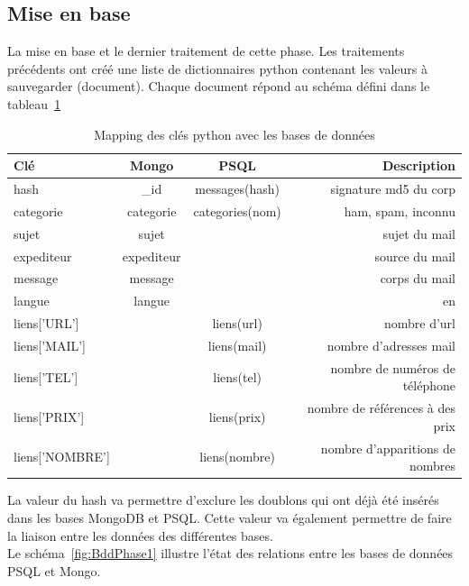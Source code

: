 \subsection{Mise en base}
    La mise en base et le dernier traitement de cette phase.
    Les traitements précédents ont créé une liste de dictionnaires python contenant les valeurs à sauvegarder (document).
    Chaque document répond au schéma défini dans le tableau~\ref{tab:mapping_fouille} \\
    \begin{table}[H]
        \centering
        \begin{tabular}{lccr}
            Clé & Mongo & PSQL & Description\\
            \hline
            hash & \_id & messages(hash) & signature md5 du corp\\
            categorie & categorie & categories(nom) & ham, spam, inconnu\\
            sujet & sujet & & sujet du mail\\
            expediteur & expediteur & & source du mail\\
            message & message & & corps du mail\\
            langue & langue & & en\\
            liens['URL'] & & liens(url) & nombre d'url\\
            liens['MAIL'] & & liens(mail) & nombre d'adresses mail\\
            liens['TEL'] & & liens(tel) & nombre de numéros de téléphone\\
            liens['PRIX'] & & liens(prix) & nombre de références à des prix\\
            liens['NOMBRE'] & & liens(nombre) & nombre d'apparitions de nombres\\
            \hline
        \end{tabular}
        \caption{Mapping des clés python avec les bases de données}
        \label{tab:mapping_fouille}
    \end{table}

    La valeur du hash va permettre d'exclure les doublons qui ont déjà été insérés dans les bases MongoDB et PSQL\@.
    Cette valeur va également permettre de faire la liaison entre les données des différentes bases.\\
    Le schéma~\ref{fig:BddPhase1} illustre l'état des relations entre les bases de données PSQL et Mongo.

